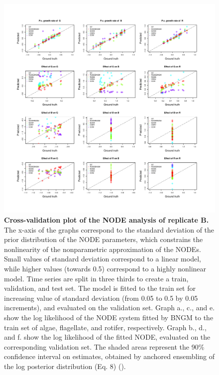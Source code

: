 \documentclass[11pt, oneside]{article}
\begin{document}
\newpage
\begin{figure}[H]
\includegraphics[width=1\linewidth,page=10]{figures/figures_supplementary.pdf}
\caption{
    \textbf{Cross-validation plot of the NODE analysis of replicate B.}
    The x-axis of the graphs correspond to the standard deviation of the prior distribution of the NODE parameters, which constrains the nonlinearity of the nonparametric approximation of the NODEs.
    Small values of standard deviation correspond to a linear model, while higher values (towards 0.5) correspond to a highly nonlinear model.
    Time series are split in three thirds to create a train, validation, and test set. 
    The model is fitted to the train set for increasing value of standard deviation (from 0.05 to 0.5 by 0.05 increments), and evaluated on the validation set.
    Graph a., c., and e. show the log likelihood of the NODE system fitted by BNGM to the train set of algae, flagellate, and rotifer, respectively.
    Graph b., d., and f. show the log likelihood of the fitted NODE, evaluated on the corresponding validation set.
    The shaded areas represent the 90\% confidence interval on estimates, obtained by anchored ensembling of the log posterior distribution (Eq. 8) (\cite{Pearce2018}).
}
\end{figure}
\newpage
\end{document}
